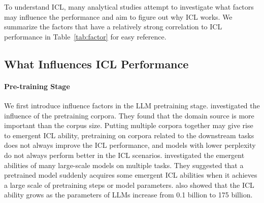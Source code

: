 To understand ICL, many analytical studies attempt to investigate what factors may influence the performance and aim to figure out why ICL works. We summarize the factors that have a relatively strong correlation to ICL performance in Table~\ref{tab:factor} for easy reference.  

\subsection{What Influences ICL Performance}

\paragraph{Pre-training Stage}
We first introduce influence factors in the LLM pretraining stage. 
\citet{shin2022corpora} investigated the influence of the pretraining corpora. 
They found that the domain source is more important than the corpus size. Putting multiple corpora together may give rise to emergent ICL ability, pretraining on corpora related to the downstream tasks does not always improve the ICL performance, and models with lower perplexity do not always perform better in the ICL scenarios.
\citet{wei2022emergent} investigated the emergent abilities of many large-scale models on multiple tasks. They suggested that a pretrained model suddenly acquires some emergent ICL abilities when it achieves a large scale of pretraining steps or model parameters. 
\citet{gpt3} also showed that the ICL ability grows as the parameters of LLMs increase from 0.1 billion to 175 billion.

